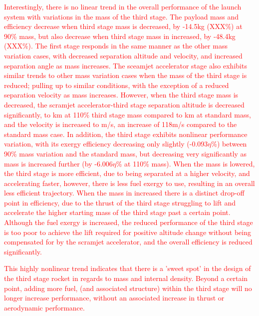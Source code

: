 \textcolor{red}{Interestingly, there is no linear trend in the overall performance of the launch system with variations in the mass of the third stage. The payload mass and efficiency decrease when third stage mass is decreased, by -14.5kg (XXX\%) at 90\% mass, but also decrease when third stage mass in increased, by -48.4kg (XXX\%). 
	The first stage responds in the same manner as the other mass variation cases, with decreased separation altitude and velocity, and increased separation angle as mass increases. The sceamjet accelerator stage also exhibits similar trends to other mass variation cases when the mass of the third stage is reduced; pulling up to similar conditions, with the exception of a reduced separation velocity as mass increases. However, when the third stage mass is decreased, the scramjet accelerator-third stage separation altitude is decreased significantly, to \secondthirdSeparationAltmThreeOneHundredTenNoReturn km at 110\% third stage mass compared to \secondthirdSeparationAltStandardNoReturn km at standard mass, and the velocity is increased to \secondthirdSeparationvmThreeOneHundredTenNoReturn m/s, an increase of 118m/s compared to the standard mass case. In addition, the third stage exhibits nonlinear performance variation, with its exergy efficiency decreasing only slightly (-0.093$\eta$\%) between 90\% mass variation and the standard mass, but decreasing very significantly as mass is increased further (by -6.006$\eta$\% at 110\% mass). When the mass is lowered, the third stage is more efficient, due to being separated at a higher velocity, and accelerating faster, however, there is less fuel exergy to use, resulting in an overall less efficient trajectory. When the mass in increased there is a distinct drop-off point in efficiency, due to the thrust of the third stage struggling to lift and accelerate the higher starting mass of the third stage past a certain point. Although the fuel exergy is increased, the reduced performance of the third stage is too poor to achieve the lift required for positive altitude change without being compensated for by the scramjet accelerator, and the overall efficiency is reduced significantly. 
}

\textcolor{red}{This highly nonlinear trend indicates that there is a 'sweet spot' in the design of the third stage rocket in regards to mass and internal density. Beyond a certain point, adding more fuel, (and associated structure) within the third stage will no longer increase performance, without an associated increase in thrust or aerodynamic performance.}

